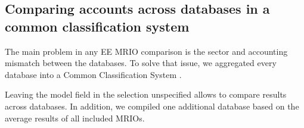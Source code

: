 \subsection{Comparing accounts across databases in a common classification system}

The main problem in any EE MRIO comparison is the sector and accounting
mismatch between the databases. To solve that issue, we aggregated every
database into a Common Classification System \cite{Steen_Olsen_2014}. 

Leaving the model field in the selection unspecified allows to compare results across databases. 
In addition, we compiled one additional database based on the average results of all included MRIOs.

